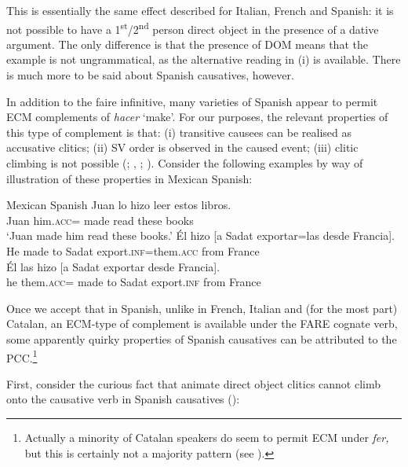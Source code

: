 \documentclass[output=paper,colorlinks,citecolor=brown,nonflat]{./langscibook}
\begin{document}
This is essentially the same effect described for Italian, French and Spanish: it is not possible to have a 1\textsuperscript{st}/2\textsuperscript{nd} person direct object in the presence of a dative argument. The only difference is that the presence of DOM means that the example is not ungrammatical, as the alternative reading in (i) is available. There is much more to be said about Spanish causatives, however. 

In addition to the faire infinitive, many varieties of Spanish appear to permit ECM complements of \textit{hacer} ‘make’. For our purposes, the relevant properties of this type of complement is that: (i) transitive causees can be realised as accusative clitics; (ii) SV order is observed in the caused event; (iii) clitic climbing is not possible (\citealt{Strozer1976}; \citealt{Treviño1992}, \citeyear{Treviño1993}; \citealt{Torrego2010, TubinoBlanco2011}). Consider the following examples by way of illustration of these properties in Mexican Spanish:

\ea%
    \label{ex:sheehan:32}
    Mexican Spanish \citep[311, 169]{Treviño1992}
    \ea\label{ex:sheehan:32a}
    \gll    Juan lo     hizo   leer   estos libros.\\
            Juan him\textsc{.acc}=  made   read   these books\\
    \glt    ‘Juan made him read these books.’  
    \ex\label{ex:sheehan:32b}
    \gll    Él  hizo  [a   Sadat  exportar=las      desde   Francia].\\
            He  made    {\db}to   Sadat  export.\textsc{inf}=them.\textsc{acc}   from   France\\
    \ex\label{ex:sheehan:32c}
    \gll    *Él  las  hizo [a   Sadat   exportar   desde   Francia].\\
            he them.\textsc{acc}=   made   {\db}to Sadat   export.\textsc{inf} from   France\\
    \z
\z 

Once we accept that in Spanish, unlike in French, Italian and (for the most part) Catalan, an ECM-type of complement is available under the FARE cognate verb, some apparently quirky properties of Spanish causatives can be attributed to the PCC.\footnote{Actually a minority of Catalan speakers do seem to permit ECM under \textit{fer,} but this is certainly not a majority pattern (see \citealt{PinedaSchifanoSheehan2018}).}  

First, consider the curious fact that animate direct object clitics cannot climb onto the causative verb in Spanish causatives (\citealt{Rivas1977, Bordelois1988, Torrego2010}):
\end{document}
